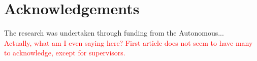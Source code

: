 \section{Acknowledgements}\label{sec:acknowledgements}
The research was undertaken through funding from the Autonomous... \\
\textcolor{red}{Actually, what am I even saying here? First article does not seem to have many to acknowledge, except for supervisors.}